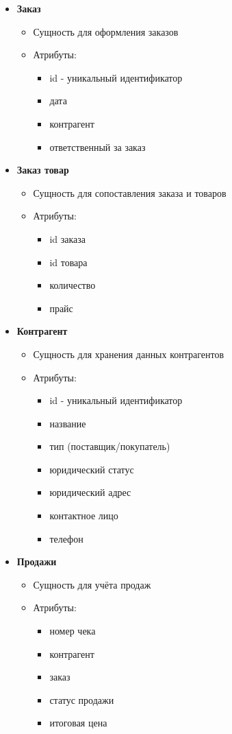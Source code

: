 \begin{itemize}
	\item \textbf{Заказ}
	\begin{itemize}
		\item Сущность для оформления заказов
		\item Атрибуты:
		\begin{itemize}
			\item id - уникальный идентификатор
			\item дата
			\item контрагент
			\item ответственный за заказ
		\end{itemize}
	\end{itemize}
	
	\item \textbf{Заказ товар}
	\begin{itemize}
		\item Сущность для сопоставления заказа и товаров
		\item Атрибуты:
		\begin{itemize}
			\item id заказа
			\item id товара
			\item количество
			\item прайс
		\end{itemize}
	\end{itemize}
	
	\item \textbf{Контрагент}
	\begin{itemize}
		\item Сущность для хранения данных контрагентов
		\item Атрибуты:
		\begin{itemize}
			\item id - уникальный идентификатор
			\item название
			\item тип (поставщик/покупатель)
			\item юридический статус
			\item юридический адрес
			\item контактное лицо
			\item телефон
		\end{itemize}
	\end{itemize}
	
	\item \textbf{Продажи}
	\begin{itemize}
		\item Сущность для учёта продаж
		\item Атрибуты:
		\begin{itemize}
			\item номер чека
			\item контрагент
			\item заказ
			\item статус продажи
			\item итоговая цена
		\end{itemize}
	\end{itemize}
	

\end{itemize}
